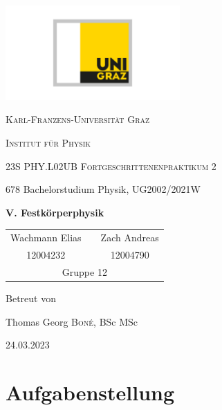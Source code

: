 \documentclass[ngerman]{scrartcl}
\begin{document}
\begin{titlepage}
    \centering
    \includegraphics[width=0.5\textwidth]{../../99_Misc/Logo_KF.pdf}\par\vspace{0.8cm}
    {\scshape\LARGE{Karl-Franzens-Universität Graz}\par}
    {\scshape\LARGE{Institut für Physik}\par}
    \vspace{1cm}
    {\scshape\Large{23S PHY.L02UB Fortgeschrittenenpraktikum 2}\par}
    678 Bachelorstudium Physik, UG2002/2021W\par
    \vspace{1.5cm}
    {\huge\bfseries V. Festkörperphysik\par}
    \vspace{2cm}
    \begin{table}[H]
        \centering
        \begin{tabular}{c c c}
            \Large Wachmann Elias &  & \Large Zach Andreas \\
            \Large 12004232       &  & \Large 12004790     \\
            \multicolumn{3}{c}{Gruppe 12}
        \end{tabular}
    \end{table}
    \vfill
    \Large Betreut von\par
    Thomas Georg \textsc{Boné}, BSc MSc
    \vfill
    {\large 24.03.2023\par}
\end{titlepage}

\clearpage
\tableofcontents
\newpage

\section[Aufgabenstellung]{Aufgabenstellung \cite{ref:angabe}}
\label{sec:aufgabenstellung}
\end{document}
